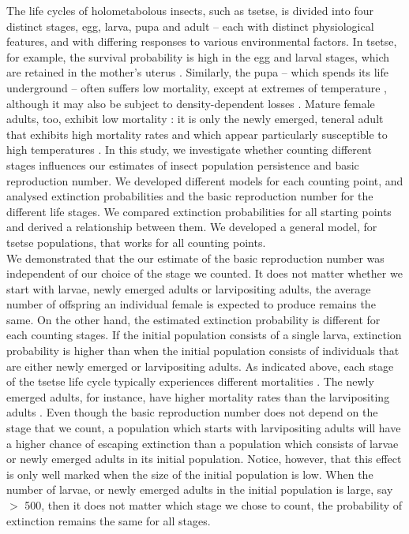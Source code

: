 The life cycles of holometabolous insects, such as tsetse, is divided into four distinct stages, egg, larva, pupa and adult – each with distinct physiological features, and with differing responses to various environmental factors. In tsetse, for example,  the survival probability is high in the egg and larval stages, which are retained in the mother’s uterus \cite{Hargrove1999a}. Similarly, the pupa – which spends its life underground – often suffers low mortality, except at extremes of temperature \cite{PhelpsR.J.&Burrows}, although it may also be subject to density-dependent losses \cite{Rogers1984,RogersD.J.Randolph1984}. Mature female adults, too, exhibit low mortality \cite{Hargrove2011}: it is only the newly emerged, teneral adult that exhibits high mortality rates and which appear particularly susceptible to high temperatures \cite{Ackley2017a}. In this study, we investigate whether counting different stages influences our estimates of insect population persistence and basic reproduction number. We developed different models for each counting point, and analysed extinction probabilities and the basic reproduction number for the different life stages. We compared extinction probabilities for all starting points and derived a relationship between them. We developed a general model, for tsetse populations, that works for all counting points. \\



We demonstrated that the our estimate of the basic reproduction number was independent of our choice of the stage we counted. It does not matter whether we start with larvae, newly emerged adults or larvipositing adults, the average number of offspring an individual female is expected to produce remains the same. On the other hand, the estimated extinction probability is different for each counting stages. If the initial population consists of a single larva, extinction probability is higher than when the initial population consists of individuals that are either newly emerged or larvipositing adults. As indicated above, each stage of the tsetse life cycle typically experiences different mortalities \cite{Hargrove2005a}. The newly emerged adults, for instance, have higher mortality rates than the larvipositing adults  \cite{Hargrove2019a}. Even though the basic reproduction number does not depend on the stage that we count, a population which starts with larvipositing adults will have a higher chance of escaping extinction than a population which consists of larvae or newly emerged adults in its initial population. Notice, however, that this effect is only well marked when the size of the initial population is low. When the number of larvae, or newly emerged adults in the initial population is large, say $>$ 500, then it does not matter which stage we chose to count, the probability of extinction remains the same for all stages.\\


